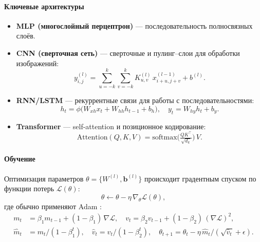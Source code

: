 \paragraph{Ключевые архитектуры}
\begin{itemize}
  \item \textbf{MLP (многослойный перцептрон)} — последовательность полносвязных слоёв.
  \item \textbf{CNN (сверточная сеть)} — сверточные и пулинг–слои для обработки изображений:
    \[
      y_{i,j}^{(l)} = \sum_{u=-k}^k\sum_{v=-k}^k
      K_{u,v}^{(l)}\,x_{i+u,j+v}^{(l-1)} + b^{(l)}.
      \label{eq:cnn_full}
    \]
  \item \textbf{RNN/LSTM} — рекуррентные связи для работы с последовательностями:
    \begin{equation}
      h_t = \phi\bigl(W_{xh}x_t + W_{hh}h_{t-1} + b_h\bigr),
      \quad
      y_t = W_{hy}h_t + b_y.
      \label{eq:rnn_full}
    \end{equation}
  \item \textbf{Transformer} — self-attention и позиционное кодирование:
    \[
      \mathrm{Attention}(Q,K,V) = \mathrm{softmax}\!\bigl(\tfrac{QK^\top}{\sqrt{d_k}}\bigr)\,V.
      \label{eq:attention_full}
    \]
\end{itemize}

\paragraph{Обучение}
Оптимизация параметров $\theta=\{W^{(l)},\mathbf{b}^{(l)}\}$ происходит
градентным спуском по функции потерь $\mathcal{L}(\theta)$:
\begin{equation}
  \theta \leftarrow \theta - \eta\,\nabla_\theta \mathcal{L}(\theta),
  \label{eq:gd_full}
\end{equation}
где обычно применяют Adam \cite{Kingma2015}:
\begin{align}
  m_t &= \beta_1 m_{t-1} + (1-\beta_1)\,\nabla\mathcal{L},\quad
  v_t = \beta_2 v_{t-1} + (1-\beta_2)\,(\nabla\mathcal{L})^2, \nonumber\\
  \hat m_t &= m_t/(1-\beta_1^t),\quad
  \hat v_t = v_t/(1-\beta_2^t),\quad
  \theta_{t+1} = \theta_t - \eta\,\hat m_t/(\sqrt{\hat v_t}+\epsilon).
  \label{eq:adam_full}
\end{align}

